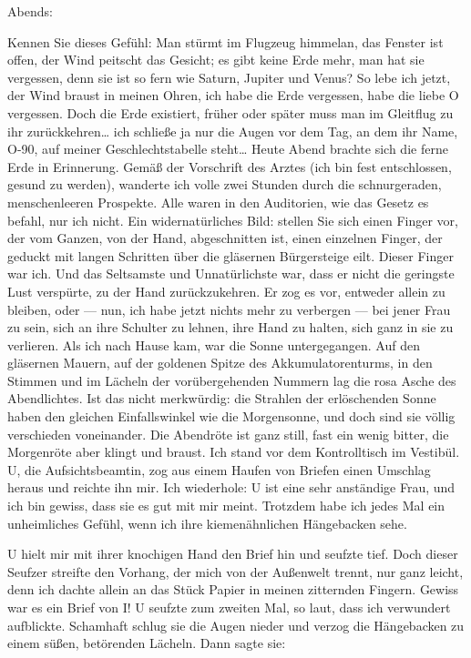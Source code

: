 Abends:

Kennen Sie dieses Gefühl: Man stürmt im Flugzeug himmelan, das
Fenster ist offen, der Wind peitscht das Gesicht; es gibt keine
Erde mehr, man hat sie vergessen, denn sie ist so fern wie Saturn,
Jupiter und Venus? So lebe ich jetzt, der Wind braust in meinen
Ohren, ich habe die Erde vergessen, habe die liebe O vergessen.
Doch die Erde existiert, früher oder später muss man im Gleitflug
zu ihr zurückkehren\ldots{} ich schließe ja nur die Augen vor dem Tag,
an dem ihr Name, O-90, auf meiner Geschlechtstabelle steht\ldots{} Heute
Abend brachte sich die ferne Erde
in Erinnerung. Gemäß der Vorschrift des Arztes (ich bin fest
entschlossen, gesund zu werden), wanderte ich volle zwei Stunden
durch die schnurgeraden, menschenleeren Prospekte. Alle waren in
den Auditorien, wie das Gesetz es befahl, nur ich nicht. Ein
widernatürliches Bild: stellen Sie sich einen Finger vor, der vom
Ganzen, von der Hand, abgeschnitten ist, einen einzelnen Finger,
der geduckt mit langen Schritten über die gläsernen Bürgersteige
eilt. Dieser Finger war ich. Und das Seltsamste und Unnatürlichste
war, dass er nicht die geringste Lust verspürte, zu der Hand
zurückzukehren. Er zog es vor, entweder allein zu bleiben, oder —
nun, ich habe jetzt nichts mehr zu verbergen — bei jener Frau zu
sein, sich an ihre Schulter zu lehnen, ihre Hand zu halten, sich
ganz in sie zu verlieren. Als ich nach Hause kam, war die Sonne
untergegangen. Auf den gläsernen Mauern, auf der goldenen Spitze
des Akkumulatorenturms, in den Stimmen und im Lächeln der
vorübergehenden Nummern lag die rosa Asche des Abendlichtes. Ist
das nicht merkwürdig: die Strahlen der erlöschenden Sonne haben den
gleichen Einfallswinkel wie die Morgensonne, und doch sind sie
völlig verschieden voneinander. Die Abendröte ist ganz still, fast
ein wenig bitter, die Morgenröte aber klingt und braust. Ich stand
vor dem Kontrolltisch im Vestibül. U, die Aufsichtsbeamtin, zog aus
einem Haufen von Briefen einen Umschlag heraus und reichte ihn mir.
Ich wiederhole: U ist eine sehr anständige Frau, und ich bin
gewiss, dass sie es gut mit mir meint. Trotzdem habe ich jedes Mal
ein unheimliches Gefühl, wenn ich ihre kiemenähnlichen Hängebacken
sehe.

U hielt mir mit ihrer knochigen Hand den Brief hin und seufzte
tief. Doch dieser Seufzer streifte den Vorhang, der mich von der
Außenwelt trennt, nur ganz leicht, denn
ich dachte allein an das Stück Papier in meinen zitternden Fingern.
Gewiss war es ein Brief von I! U seufzte zum zweiten Mal, so laut,
dass ich verwundert aufblickte. Schamhaft schlug sie die Augen
nieder und verzog die Hängebacken zu einem süßen, betörenden
Lächeln. Dann sagte sie:

